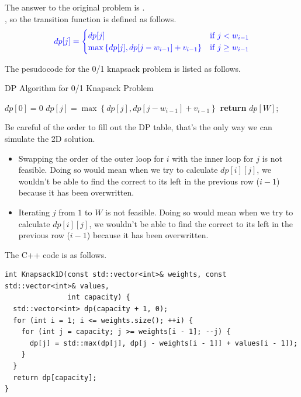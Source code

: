 The answer to the original problem is {\color{blue}{$ dp[W] $}}.\\

{\color{ForestGreen}{For each item $i$, we can choose to either put it into the knapsack or not}}, so the transition function is defined as follows.
\begin{equation}
{\color{blue}{
dp[j] = 
\begin{cases} 
    dp[j] & \text{if}\ j < w_{i-1}\\
    \max\left\{dp[j], dp[j - w_{i-1}] + v_{i-1}\right\} & \text{if}\ j \geq w_{i-1} 
\end{cases}
}}
\end{equation}

The pesudocode for the 0/1 knapsack problem is listed as follows.
\begin{algorithm}[H]
\caption{DP Algorithm for 0/1 Knapsack Problem}
\begin{algorithmic}[1]
\State $dp[0] = 0$ 
\For{{\color{blue}{$i = 1$ to $n$}}}
        \State  $dp[j] = \max\left\{dp[j], dp[j - w_{i-1}] + v_{i-1}\right\}$
    \EndFor
\EndFor
\State \textbf{return} $dp[W]$;
\end{algorithmic}
\end{algorithm}

Be careful of the order to fill out the DP table, that's the only way we can simulate the 2D solution.
\begin{itemize}
\item Swapping the order of the outer loop for $i$ with the inner loop for $j$ is not feasible. Doing so would mean when we try to calculate $dp[i][j]$, we wouldn't be able to find the correct to its left in the previous row ($i-1$) because it has been overwritten.
\item Iterating $j$ from $1$ to $W$ is not feasible. Doing so would mean when we try to calculate $dp[i][j]$, we wouldn't be able to find the correct to its left in the previous row ($i-1$) because it has been overwritten.
\end{itemize}

The C++ code is as follows.
\begin{lstlisting}
int Knapsack1D(const std::vector<int>& weights, const std::vector<int>& values,
               int capacity) {
  std::vector<int> dp(capacity + 1, 0);
  for (int i = 1; i <= weights.size(); ++i) {
    for (int j = capacity; j >= weights[i - 1]; --j) {
      dp[j] = std::max(dp[j], dp[j - weights[i - 1]] + values[i - 1]);
    }
  }
  return dp[capacity];
}
\end{lstlisting}

